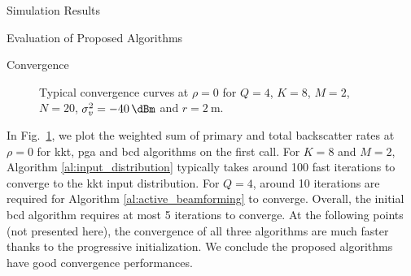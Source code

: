 \documentclass[journal]{IEEEtran}
\begin{document}
\begin{section}{Simulation Results}
\begin{subsection}{Evaluation of Proposed Algorithms}
		\begin{subsubsection}{Convergence}
			\begin{figure}[!t]
				\centering
				\resizebox{0.75\columnwidth}{!}{
					
				}
				\caption{Typical convergence curves at $\rho=0$ for $Q=4$, $K=8$, $M=2$, $N=20$, $\sigma_v^2=\SI{-40}{\dBm}$ and $r=\SI{2}{\meter}$.}
				\label{fg:wsr_convergence}
			\end{figure}

			In Fig.~\ref{fg:wsr_convergence}, we plot the weighted sum of primary and total backscatter rates at $\rho=0$ for \gls{kkt}, \gls{pga} and \gls{bcd} algorithms on the first call.
			For $K=8$ and $M=2$, Algorithm \ref{al:input_distribution} typically takes around \num{100} fast iterations to converge to the \gls{kkt} input distribution.
			For $Q=4$, around \num{10} iterations are required for Algorithm \ref{al:active_beamforming} to converge.
			Overall, the initial \gls{bcd} algorithm requires at most \num{5} iterations to converge.
			At the following points (not presented here), the convergence of all three algorithms are much faster thanks to the progressive initialization.
			We conclude the proposed algorithms have good convergence performances.
		\end{subsubsection}
	\end{subsection}


\end{section}
\end{document}
